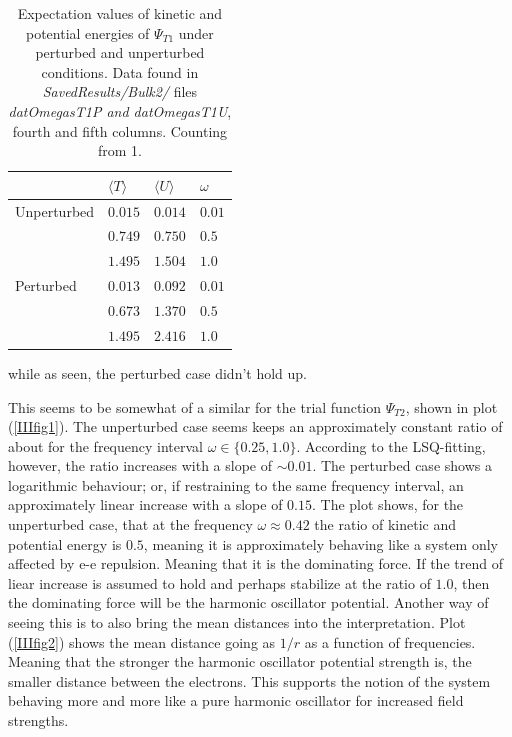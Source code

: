 \documentclass[aip,nobalancelastpage,
twocolumn,
rsi,%
 amsmath,amssymb,
 reprint,%
]{revtex4}
\begin{document}
\begin{table}[H]
\center
\caption{Expectation values of kinetic and potential energies of $\Psi_{T1}$ under perturbed and unperturbed conditions. Data found in \textit{SavedResults/Bulk2/} files \textit{datOmegasT1P and datOmegasT1U}, fourth and fifth columns. Counting from 1.}
\begin{tabular}{| p{2cm} | p{1.5cm} | p{1.5cm} | p{1.5cm} |}
\hline
 & $\langle T \rangle$ & $\langle U \rangle$ & $\omega$ \\
 \hline
Unperturbed & $0.015$ & $0.014$ & $0.01$ \\
\hline
	& $0.749$ & $0.750$ & $0.5$\\
\hline
 & $1.495$ & $1.504$ & $1.0$\\
 \hline
Perturbed & $0.013$ & $0.092$ & $0.01$ \\
\hline
	& $0.673$ & $1.370$ & $0.5$\\
\hline
 & $1.495$ & $2.416$ & $1.0$\\
 \hline 
\end{tabular}
\end{table}

while as seen, the perturbed case didn't hold up. \par 
This seems to be somewhat of a similar for the trial function $\Psi_{T2}$, shown in plot (\ref{IIIfig1}). The unperturbed case seems keeps an approximately constant ratio of about for the frequency interval $\omega \in \{0.25,1.0\}$. According to the LSQ-fitting, however, the ratio increases with a slope of $\sim 0.01$. The perturbed case shows a logarithmic behaviour; or, if restraining to the same frequency interval, an approximately linear increase with a slope of $0.15$. The plot shows, for the unperturbed case, that at the frequency $\omega\approx 0.42$ the ratio of kinetic and potential energy is $0.5$, meaning it is approximately behaving like a system only affected by e-e repulsion. Meaning that it is the dominating force. If the trend of liear increase is assumed to hold and perhaps stabilize at the ratio of $1.0$, then the dominating force will be the harmonic oscillator potential. Another way of seeing this is to also bring the mean distances into the interpretation. Plot (\ref{IIIfig2}) shows the mean distance going as $1/r$ as a function of frequencies. Meaning that the stronger the harmonic oscillator potential strength is, the smaller distance between the electrons. This supports the notion of the system behaving more and more like a pure harmonic oscillator for increased field strengths.
\end{document}
